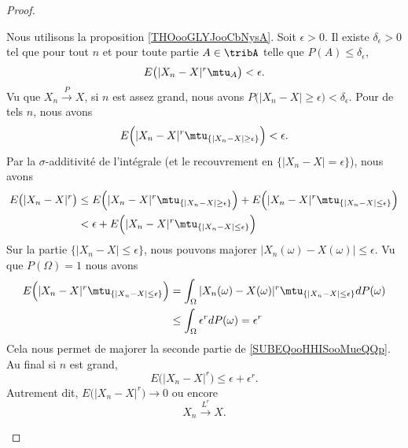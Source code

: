 \begin{proof}
\begin{subproof}
		Nous utilisons la proposition \ref{THOooGLYJooCbNysA}. Soit \( \epsilon>0\). Il existe \( \delta_{\epsilon}>0\) tel que pour tout \( n\) et pour toute partie \( A\in\tribA\) telle que \( P(A)\leq \delta_{\epsilon}\),
		\begin{equation}
			E\big( | X_n-X |^r\mtu_A \big)<\epsilon.
		\end{equation}
		Vu que \( X_n\stackrel{ P}{\longrightarrow} X\), si \( n\) est assez grand, nous avons \( P\big( | X_n-X |\geq \epsilon \big)<\delta_{\epsilon}\). Pour de tels \( n\), nous avons
		\begin{equation}
			E\Big( | X_n-X |^r\mtu_{\{ | X_n-X |\geq \epsilon \}} \Big)<\epsilon.
		\end{equation}
		Par la \( \sigma\)-additivité de l'intégrale (et le recouvrement en \( \{ | X_n-X |=\epsilon \}\)), nous avons
		\begin{subequations}
			\begin{align}
				E\big( | X_n-X |^r \big) & \leq E\Big( | X_n-X |^r\mtu_{\{ | X_n-X |\geq \epsilon \}} \Big) + E\Big( | X_n-X |^r\mtu_{\{ | X_n-X |\leq \epsilon \}} \Big) \\
				                         & < \epsilon + E\Big( | X_n-X |^r\mtu_{\{ | X_n-X |\leq \epsilon \}} \Big)		\label{SUBEQooHHISooMueQQp}
			\end{align}
		\end{subequations}
		Sur la partie \( \{ | X_n-X |\leq \epsilon \}\), nous pouvons majorer \( | X_n(\omega)-X(\omega) |\leq \epsilon\). Vu que \( P(\Omega)=1\) nous avons
		\begin{subequations}
			\begin{align}
				E\Big( | X_n-X |^r\mtu_{\{ | X_n-X |\leq \epsilon \} }\Big) &
				= \int_{\Omega}| X_n(\omega)-X(\omega) |^r\mtu_{\{ | X_n-X|\leq\epsilon\}}dP(\omega)                             \\
				                                                            & \leq  \int_{\Omega}\epsilon^rdP(\omega)=\epsilon^r
			\end{align}
		\end{subequations}
		Cela nous permet de majorer la seconde partie de \eqref{SUBEQooHHISooMueQQp}. Au final si \( n\) est grand,
		\begin{equation}
			E\big( | X_n-X |^r \big)\leq \epsilon+\epsilon^r.
		\end{equation}
		Autrement dit, \( E\big( | X_n-X |^r \big)\to 0\) ou encore
		\begin{equation}
			X_n\stackrel{ L^r}{\longrightarrow} X.
		\end{equation}


\end{subproof}
\end{proof}
